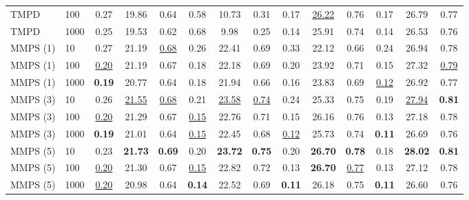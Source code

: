 \begin{subappendices}
\begin{table}
{\begin{tabular}{ll|ccc|ccc|ccc|ccc}
        TMPD \cite{boys2023tweedie} & 100 & 0.27 & 19.86 & 0.64 & 0.58 & 10.73 & 0.31 & 0.17 & \underline{26.22} & 0.76 & 0.17 & 26.79 & 0.77 \\
        TMPD \cite{boys2023tweedie} & 1000 & 0.25 & 19.53 & 0.62 & 0.68 & 9.98 & 0.25 & 0.14 & 25.91 & 0.74 & 0.14 & 26.53 & 0.76 \\
        \midrule
        MMPS (1) & 10 & 0.27 & 21.19 & \underline{0.68} & 0.26 & 22.41 & 0.69 & 0.33 & 22.12 & 0.66 & 0.24 & 26.94 & 0.78 \\
        MMPS (1) & 100 & \underline{0.20} & 21.19 & 0.67 & 0.18 & 22.18 & 0.69 & 0.20 & 23.92 & 0.71 & 0.15 & 27.32 & \underline{0.79} \\
        MMPS (1) & 1000 & \textbf{0.19} & 20.77 & 0.64 & 0.18 & 21.94 & 0.66 & 0.16 & 23.83 & 0.69 & \underline{0.12} & 26.92 & 0.77 \\
        MMPS (3) & 10 & 0.26 & \underline{21.55} & \underline{0.68} & 0.21 & \underline{23.58} & \underline{0.74} & 0.24 & 25.33 & 0.75 & 0.19 & \underline{27.94} & \textbf{0.81} \\
        MMPS (3) & 100 & \underline{0.20} & 21.29 & 0.67 & \underline{0.15} & 22.76 & 0.71 & 0.15 & 26.16 & 0.76 & 0.13 & 27.18 & 0.78 \\
        MMPS (3) & 1000 & \textbf{0.19} & 21.01 & 0.64 & \underline{0.15} & 22.45 & 0.68 & \underline{0.12} & 25.73 & 0.74 & \textbf{0.11} & 26.69 & 0.76 \\
        MMPS (5) & 10 & 0.23 & \textbf{21.73} & \textbf{0.69} & 0.20 & \textbf{23.72} & \textbf{0.75} & 0.20 & \textbf{26.70} & \textbf{0.78} & 0.18 & \textbf{28.02} & \textbf{0.81} \\
        MMPS (5) & 100 & \underline{0.20} & 21.30 & 0.67 & \underline{0.15} & 22.82 & 0.72 & 0.13 & \textbf{26.70} & \underline{0.77} & 0.13 & 27.12 & 0.78 \\
        MMPS (5) & 1000 & \underline{0.20} & 20.98 & 0.64 & \textbf{0.14} & 22.52 & 0.69 & \textbf{0.11} & 26.18 & 0.75 & \textbf{0.11} & 26.60 & 0.76 \\
        \bottomrule
    \end{tabular}}
    \label{tab:quantitative}
\end{table}


\end{subappendices}
